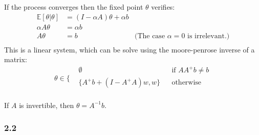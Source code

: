 \documentclass[a4paper]{article}
\begin{document}
If the process converges then the fixed point $\theta$ verifies:
\begin{equation*}
    \begin{aligned}
        \mathbb{E}[\theta|\theta] & = (I - \alpha A) \theta + \alpha b                                               \\
        \alpha A \theta           & = \alpha b                                                                       \\
        A \theta                  & = b                                & \text{(The case $\alpha=0$ is irrelevant.)} \\
    \end{aligned}
\end{equation*}
This is a linear system, which can be solve using the moore-penrose inverse of a matrix:
\begin{equation*}
    \theta \in \Bigg\{ \begin{aligned}
         & \emptyset                   &  & \text{if $AA^+b \neq b$} \\
         & \{A^+ b + (I - A^+A)w, w \} &  & \text{otherwise}         \\
    \end{aligned}
\end{equation*}

If $A$ is invertible, then $\boxed{\theta = A^{-1}b}$.

\subsubsection*{2.2}
\end{document}
